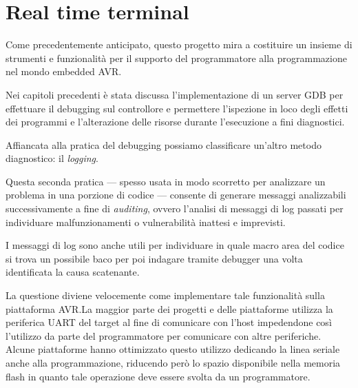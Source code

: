 \chapter{Real time terminal}

Come precedentemente anticipato, questo progetto mira a costituire un insieme di strumenti e funzionalità per il supporto del programmatore alla programmazione nel mondo embedded AVR.\@

Nei capitoli precedenti è stata discussa l'implementazione di un server GDB per effettuare il debugging sul controllore e permettere l'ispezione in loco degli effetti dei programmi e l'alterazione delle risorse durante l'esecuzione a fini diagnostici. 

Affiancata alla pratica del debugging possiamo classificare un'altro metodo diagnostico: il \textit{logging}.

Questa seconda pratica --- spesso usata in modo scorretto per analizzare un problema in una porzione di codice --- consente di generare messaggi analizzabili successivamente a fine di \textit{auditing}, ovvero l'analisi di messaggi di log passati per individuare malfunzionamenti o vulnerabilità inattesi e imprevisti.

I messaggi di log sono anche utili per individuare in quale macro area del codice si trova un possibile baco per poi indagare tramite debugger una volta identificata la causa scatenante.

La questione diviene velocemente come implementare tale funzionalità sulla piattaforma AVR.\@ La maggior parte dei progetti e delle piattaforme utilizza la periferica UART del target al fine di comunicare con l'host impedendone così l'utilizzo da parte del programmatore per comunicare con altre periferiche. Alcune piattaforme hanno ottimizzato questo utilizzo dedicando la linea seriale anche alla programmazione, riducendo però lo spazio disponibile nella memoria flash in quanto tale operazione deve essere svolta da un programmatore. 